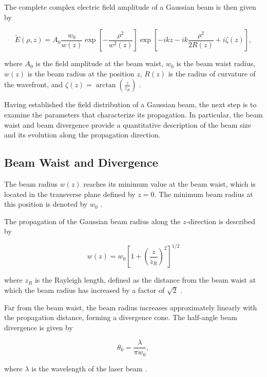 The complete complex electric field amplitude of a Gaussian beam is then given by

\begin{equation}
\tilde{E}(\rho,z)=A_0\frac{w_0}{w(z)}
\exp\left[-\frac{\rho^2}{w^2(z)}\right]
\exp\left[-ikz-ik\frac{\rho^2}{2R(z)}+i\zeta(z)\right],
\end{equation}

where \(A_0\) is the field amplitude at the beam waist, \(w_0\) is the beam waist radius, \(w(z)\) is the beam radius at the position \(z\), \(R(z)\) is the radius of curvature of the wavefront, and \(\zeta(z)=\arctan\!\left(\frac{z}{z_R}\right)\) .

Having established the field distribution of a Gaussian beam, the next step is to examine the parameters that characterize its propagation. In particular, the beam waist and beam divergence provide a quantitative description of the beam size and its evolution along the propagation direction.


\subsection{Beam Waist and Divergence}\label{sec:beam_waist_divergence}

The beam radius \(w(z)\) reaches its minimum value at the beam waist, which is located in the transverse plane defined by \(z=0\). The minimum beam radius at this position is denoted by \(w_0\) .

The propagation of the Gaussian beam radius along the \(z\)-direction is described by

\begin{equation}
w(z)=w_0\left[1+\left(\frac{z}{z_R}\right)^2\right]^{1/2}
\label{eq:beam_radius_propagation}
\end{equation}

where \(z_R\) is the Rayleigh length, defined as the distance from the beam waist at which the beam radius has increased by a factor of \(\sqrt{2}\) .

Far from the beam waist, the beam radius increases approximately linearly with the propagation distance, forming a divergence cone. The half-angle beam divergence is given by

\begin{equation}
\theta_0=\frac{\lambda}{\pi w_0},
\end{equation}

where \(\lambda\) is the wavelength of the laser beam .





